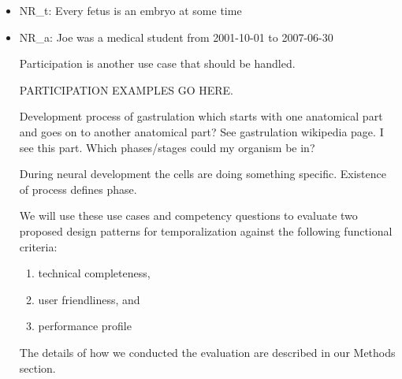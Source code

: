 \begin{itemize}
\item NR\_t: Every fetus is an embryo at some time
\item NR\_a: Joe was a medical student from 2001-10-01 to 2007-06-30

Participation is another use case that should be handled. 

PARTICIPATION EXAMPLES GO HERE.

Development process of gastrulation which starts with one anatomical part and goes on to another anatomical part? See gastrulation wikipedia page. 
I see this part. Which phases/stages could my organism be in?

During neural development the cells are doing something specific. Existence of process defines phase.


We will use these use cases and competency questions to evaluate two proposed design patterns for temporalization against the following functional criteria:
\begin{enumerate}
    \item technical completeness, 
    \item user friendliness, and
    \item performance profile
\end{enumerate}
The details of how we conducted the evaluation are described in our Methods section.

\end{itemize}



